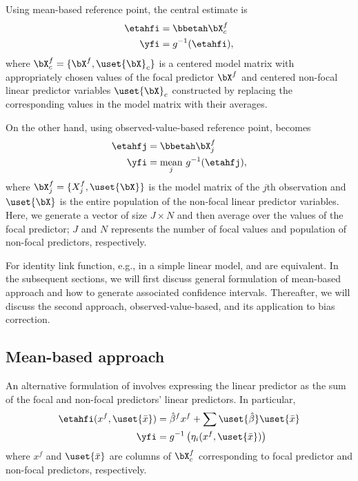 Using mean-based reference point, the central estimate is
%
\begin{align}\label{eq:eta_linear_mean}
\etahfi &= \bbetah \bX^{f}_c \nonumber\\
\yfi &= g^{-1}(\etahfi),
\end{align}
%
where $\bX^{f}_c = \{\bX^{f}, \uset{{\bX}}_c\}$ is a centered model matrix with appropriately chosen values of the focal predictor $\bX^{f}$ and centered non-focal linear predictor variables $\uset{{\bX}}_c$ constructed by replacing the corresponding values in the model matrix with their averages. 

On the other hand, using observed-value-based reference point, 
becomes
%
\begin{align}\label{eq:eta_linear_sample}
\etahfj &= \bbetah \bX^{f}_j \nonumber\\
\yfi  &= \underset{j}{\textrm{mean}} ~ g^{-1} (\etahfj),
\end{align}
%
where $\bX^{f}_j = \{X^{f}_j, \uset{{\bX}}\}$ is the model matrix of the $j$th
observation and $\uset{{\bX}}$ is the entire population of the non-focal linear
predictor variables. Here, we generate a vector of size $J \times N$ and then average over the values of the focal predictor; $J$ and $N$ represents the number of focal values and population of non-focal predictors, respectively.

For identity link function, e.g., in a simple linear model,  and  are equivalent. In the subsequent sections, we will first discuss general formulation of mean-based approach and how to generate associated confidence intervals. Thereafter, we will discuss the second approach, observed-value-based, and its application to bias correction.


\subsection{Mean-based approach}

An alternative formulation of  involves expressing the linear predictor as the sum of the focal and non-focal predictors' linear predictors. In particular, 
%
\begin{align}\label{eq:eta_mean}
\etahfi(x^f, \uset{{\bar{x}}}) &= \hat{\beta}^f x^f + \sum \uset{\hat{\beta}} \uset{{\bar{x}}} \\
\yfi  &= g^{-1} \left(\eta_i(x^f, \uset{{\bar{x}}})\right)
\end{align}
where $x^f$ and $\uset{{\bar{x}}}$ are columns of $\bX^{f}_c$ corresponding to focal predictor and non-focal predictors, respectively.


